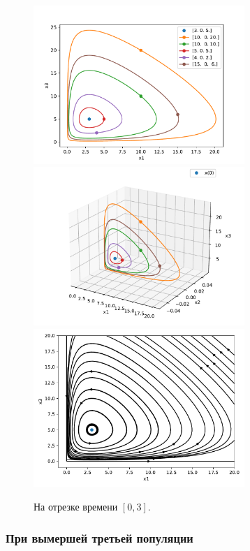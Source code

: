     \begin{figure}[H]
        \centering
        \includegraphics[width=8cm]{pictures/x2_0phase.pdf}
        \includegraphics[width=8cm]{pictures/x2_0phase3.pdf}
        \includegraphics[width=8cm]{pictures/x2_0vector.pdf}
        \caption{На отрезке времени \( [0, 3] \).}
    \end{figure}


    \subsubsection{При вымершей третьей популяции}

